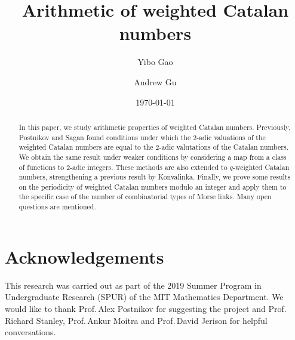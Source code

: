 \documentclass[11pt]{amsart}
\author{Yibo Gao}
\author{Andrew Gu}
\theoremstyle{definition}
\begin{document}
\title{Arithmetic of weighted Catalan numbers}
\date{\today}

\begin{abstract}
In this paper, we study arithmetic properties of weighted Catalan numbers. Previously, Postnikov and Sagan found conditions under which the $2$-adic valuations of the weighted Catalan numbers are equal to the $2$-adic valutations of the Catalan numbers. We obtain the same result under weaker conditions by considering a map from a class of functions to $2$-adic integers. These methods are also extended to $q$-weighted Catalan numbers, strengthening a previous result by Konvalinka. Finally, we prove some results on the periodicity of weighted Catalan numbers modulo an integer and apply them to the specific case of the number of combinatorial types of Morse links. Many open questions are mentioned.
\end{abstract}
\maketitle







\section*{Acknowledgements}
This research was carried out as part of the 2019 Summer Program in Undergraduate Research (SPUR) of the MIT Mathematics Department. We would like to thank Prof.\,Alex Postnikov for suggesting the project and Prof.\,Richard Stanley, Prof.\,Ankur Moitra and Prof.\,David Jerison for helpful conversations.



\end{document}
